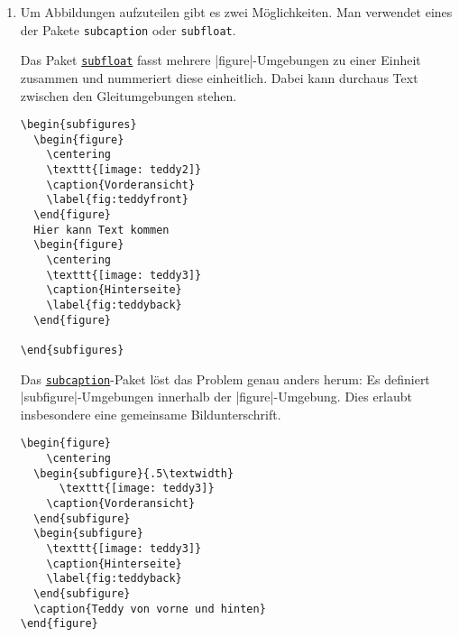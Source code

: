 \documentclass{scrartcl}
\newcommand{\pkg}[1]{\href{http://ctan.org/pkg/#1}{\texttt{#1}}}
\begin{document}
\newsavebox{\SolutionCodeB}
\begin{lrbox}{\SolutionCodeB}
\begin{minipage}{\textwidth}
	\begin{enumerate}[label=\alph*)]\addtocounter{enumi}{1}

	\item Um Abbildungen aufzuteilen gibt es zwei Möglichkeiten. Man verwendet eines der Pakete \verb+subcaption+ oder \verb+subfloat+.
		
		Das Paket \pkg{subfloat} fasst mehrere |figure|-Umgebungen zu einer Einheit zusammen und nummeriert diese einheitlich. Dabei kann durchaus Text zwischen den Gleitumgebungen stehen.
\begin{lstlisting}
\begin{subfigures}
  \begin{figure}
    \centering
    \texttt{[image: teddy2]}
    \caption{Vorderansicht}
    \label{fig:teddyfront}
  \end{figure}
  Hier kann Text kommen
  \begin{figure}
    \centering
    \texttt{[image: teddy3]}
    \caption{Hinterseite}
    \label{fig:teddyback}
  \end{figure}

\end{subfigures}
\end{lstlisting}


	Das \pkg{subcaption}-Paket löst das Problem genau anders herum: Es definiert |subfigure|-Umgebungen innerhalb der |figure|-Umgebung. Dies erlaubt insbesondere eine gemeinsame Bildunterschrift.
	
\begin{lstlisting}
\begin{figure}
	\centering
  \begin{subfigure}{.5\textwidth}
	  \texttt{[image: teddy3]}
    \caption{Vorderansicht}
  \end{subfigure}
  \begin{subfigure}
    \texttt{[image: teddy3]}
    \caption{Hinterseite}
    \label{fig:teddyback}
  \end{subfigure}
  \caption{Teddy von vorne und hinten}
\end{figure}
\end{lstlisting}
	\end{enumerate}
\end{minipage}
\end{lrbox}
\end{document}
